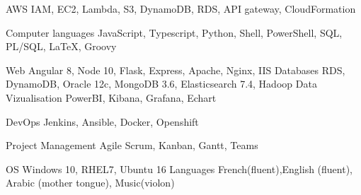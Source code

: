 

\begin{cvskills}

\cvskill
    {AWS} %
    {IAM, EC2, Lambda, S3, DynamoDB, RDS, API gateway, CloudFormation } %

  \cvskill
    {Computer languages} %
    {JavaScript, Typescript, Python, Shell, PowerShell, SQL, PL/SQL, LaTeX, Groovy } %

  \cvskill
    {Web} %
    {Angular 8, Node 10, Flask, Express, Apache, Nginx, IIS} %
  \cvskill
    {Databases} %
    {RDS, DynamoDB, Oracle 12c, MongoDB 3.6, Elasticsearch 7.4, Hadoop} %
\cvskill
    {Data Vizualisation} %
    {PowerBI, Kibana, Grafana, Echart } %

  \cvskill
    {DevOps} %
    {Jenkins, Ansible, Docker, Openshift } %

\cvskill
    {Project Management} %
    {Agile Scrum, Kanban, Gantt, Teams } %

  \cvskill
    {OS} %
    {Windows 10, RHEL7, Ubuntu 16} %
  \cvskill
    {Languages } %
    {French(fluent),English (fluent), Arabic (mother tongue), Music(violon)} %
\end{cvskills}
